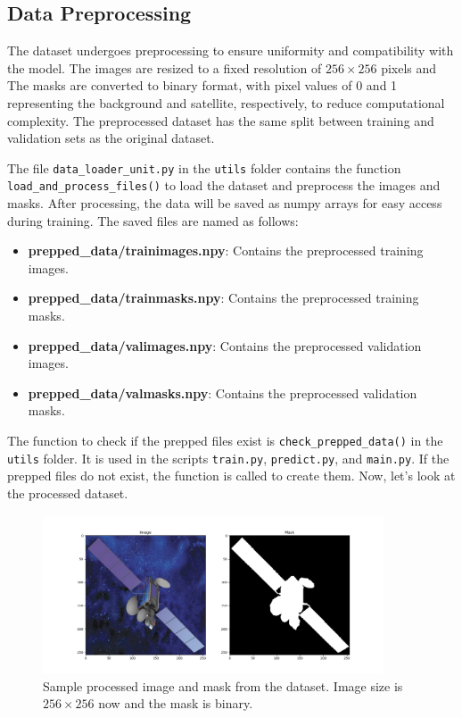 \documentclass{article}
\begin{document}
\subsection{Data Preprocessing}

The dataset undergoes preprocessing to ensure uniformity and compatibility with the model. The images
are resized to a fixed resolution of $256 \times 256$ pixels and The masks are converted to binary format, with 
pixel values of 0 and 1 representing the background and satellite, respectively, to reduce computational
complexity. The preprocessed dataset has the same split between training and validation sets as the 
original dataset.
\vspace{1em}

The file \texttt{data\_loader\_unit.py} in the \texttt{utils} folder contains the function 
\texttt{load\_and\_process\_files()} to load the dataset and preprocess the images and masks. After processing, 
the data will be saved as numpy arrays for easy access during training. The saved files are named as follows:

\begin{itemize}
    \item \textbf{prepped\_data/trainimages.npy}: Contains the preprocessed training images.
    \item \textbf{prepped\_data/trainmasks.npy}: Contains the preprocessed training masks.
    \item \textbf{prepped\_data/valimages.npy}: Contains the preprocessed validation images.
    \item \textbf{prepped\_data/valmasks.npy}: Contains the preprocessed validation masks.
\end{itemize}
\vspace{1em}

The function to check if the prepped files exist is \texttt{check\_prepped\_data()} in the \texttt{utils} folder.
It is used in the scripts \texttt{train.py}, \texttt{predict.py}, and \texttt{main.py}. If the prepped files 
do not exist, the function is called to create them. Now, let's look at the processed dataset.

\begin{figure}[h]
    \centering
    \includegraphics[width=0.9\textwidth]{../images/processed_input_sample.png}
    \caption{Sample processed image and mask from the dataset. Image size is $256 \times 256$ now and the mask is binary.}
    \label{fig:preprocessed_dataset}
\end{figure}
\end{document}
